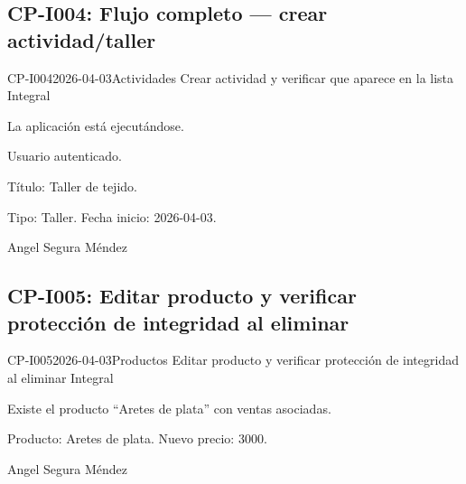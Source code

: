 \subsection{CP-I004: Flujo completo --- crear actividad/taller}
\def\cpPasos{%
  \item Navegar a ``Actividades'' \arr{} nueva actividad.
  \item Ingresar título ``Taller de tejido'', tipo y fecha inicio.
  \item Guardar.
  \item Verificar que aparece en la lista de actividades.}
\def\cpResultadoE{%
  \item La actividad ``Taller de tejido'' aparece en la lista.}
\def\cpResultadoO{La actividad se creó y apareció correctamente en la lista de actividades.}
\casoprueba
  {CP-I004}{2026-04-03}{Actividades}
  {Crear actividad y verificar que aparece en la lista}
  {Integral}{\estadoAprobado}
  {\item La aplicación está ejecutándose.
   \item Usuario autenticado.}
  {\item Título: Taller de tejido.
   \item Tipo: Taller. Fecha inicio: 2026-04-03.}
  {Angel Segura Méndez}

\subsection{CP-I005: Editar producto y verificar protección de integridad al eliminar}
\def\cpPasos{%
  \item Navegar a ``Productos'' \arr{} editar ``Aretes de plata''.
  \item Cambiar precio a \CRC{}3000.
  \item Guardar y verificar que el precio se actualizó en la lista.
  \item Intentar eliminar ``Aretes de plata''.}
\def\cpResultadoE{%
  \item La edición funciona correctamente.
  \item La eliminación falla con mensaje por registros asociados.}
\def\cpResultadoO{El precio se actualizó correctamente a \CRC{}3000. Al intentar
  eliminar, el sistema mostró: ``no se puede eliminar porque tiene registros asociados''.
  La integridad referencial funciona correctamente.}
\casoprueba
  {CP-I005}{2026-04-03}{Productos}
  {Editar producto y verificar protección de integridad al eliminar}
  {Integral}{\estadoAprobado}
  {\item Existe el producto ``Aretes de plata'' con ventas asociadas.}
  {\item Producto: Aretes de plata. Nuevo precio: \CRC{}3000.}
  {Angel Segura Méndez}

